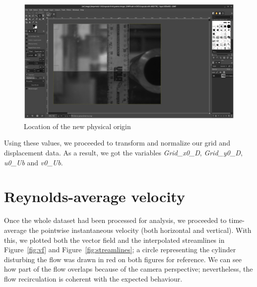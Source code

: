 \documentclass[12pt]{article}
\begin{document}
        \begin{figure}[ht!]
                \centering
                \includegraphics[width=\textwidth]{New_Reference.png}
                \caption{Location of the new physical origin}
                \label{fig:origin}
        \end{figure}

        Using these values, we proceeded to transform and normalize our grid and displacement data. As a result, we got the variables \textit{Grid\_x0\_D}, \textit{Grid\_y0\_D}, \textit{u0\_Ub} and \textit{v0\_Ub}.

\section{Reynolds-average velocity} \label{sec:RANS}

        Once the whole dataset had been processed for analysis, we proceeded to time-average the pointwise instantaneous velocity (both horizontal and vertical). With this, we plotted both the vector field and the interpolated streamlines in Figure~\ref{fig:vf} and Figure~\ref{fig:streamlines}; a circle representing the cylinder disturbing the flow was drawn in red on both figures for reference. We can see how part of the flow overlaps because of the camera perspective; nevertheless, the flow recirculation is coherent with the expected behaviour.
\end{document}
